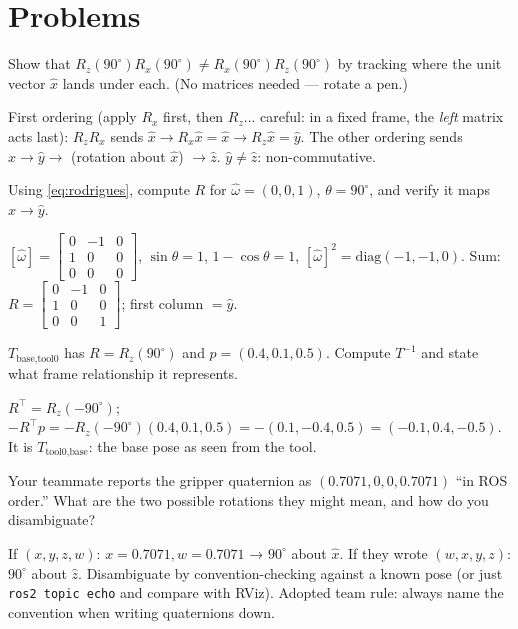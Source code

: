 \section{Problems}

\begin{problem}
Show that $R_z(90^\circ)R_x(90^\circ) \neq R_x(90^\circ)R_z(90^\circ)$ by tracking where the
unit vector $\hat x$ lands under each. (No matrices needed --- rotate a pen.)
\end{problem}
\begin{answer}
First ordering (apply $R_x$ first, then $R_z$... careful: in a fixed frame, the \emph{left}
matrix acts last): $R_z R_x$ sends $\hat x \to R_x \hat x = \hat x \to R_z \hat x = \hat y$.
The other ordering sends $\hat x \to \hat y \to$ (rotation about $\hat x$) $\to \hat z$.
$\hat y \neq \hat z$: non-commutative.
\end{answer}

\begin{problem}
Using \eqref{eq:rodrigues}, compute $R$ for $\hat\omega = (0,0,1)$, $\theta = 90^\circ$, and
verify it maps $\hat x \to \hat y$.
\end{problem}
\begin{answer}
$[\hat\omega] = \begin{bmatrix}0&-1&0\\1&0&0\\0&0&0\end{bmatrix}$, $\sin\theta = 1$,
$1-\cos\theta = 1$, $[\hat\omega]^2 = \mathrm{diag}(-1,-1,0)$. Sum:
$R = \begin{bmatrix}0&-1&0\\1&0&0\\0&0&1\end{bmatrix}$; first column $= \hat y$. \qedhere
\end{answer}

\begin{problem}
$T_{\text{base,tool0}}$ has $R = R_z(90^\circ)$ and $p = (0.4, 0.1, 0.5)$. Compute
$T^{-1}$ and state what frame relationship it represents.
\end{problem}
\begin{answer}
$R^\top = R_z(-90^\circ)$;
$-R^\top p = -R_z(-90^\circ)(0.4,0.1,0.5) = -(0.1, -0.4, 0.5) = (-0.1, 0.4, -0.5)$.
It is $T_{\text{tool0,base}}$: the base pose as seen from the tool.
\end{answer}

\begin{problem}[transfer]
Your teammate reports the gripper quaternion as $(0.7071, 0, 0, 0.7071)$ ``in ROS order.''
What are the two possible rotations they might mean, and how do you disambiguate?
\end{problem}
\begin{answer}
If $(x,y,z,w)$: $x = 0.7071, w = 0.7071$ → $90^\circ$ about $\hat x$. If they wrote $(w,x,y,z)$:
$90^\circ$ about $\hat z$. Disambiguate by convention-checking against a known pose (or just
\texttt{ros2 topic echo} and compare with RViz). Adopted team rule: always name the convention
when writing quaternions down.
\end{answer}
